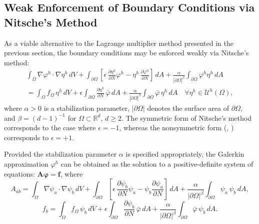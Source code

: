 	\subsection*{Weak Enforcement of Boundary Conditions via Nitsche's Method}
	
	As a viable alternative to the Lagrange multiplier method presented in the previous section, the boundary conditions may be enforced weakly via Nitsche's method:
	\begin{eqnarray}
		\int_{\Omega} \nabla \varphi^h \cdot \nabla \eta^h \, dV + \int_{\partial \Omega} \left[ \epsilon \, \frac{\partial \eta^h}{\partial N} \varphi^h - \eta^h \, \frac{\partial \varphi^h}{\partial N} \right] \, dA + \frac{\alpha}{|\partial \Omega|^{\beta}} \int_{\partial \Omega} \varphi^h \eta^h \, dA \nonumber \\ = \int_\Omega f_\Omega \, \eta^h \, dV + \epsilon \int_{\partial \Omega} \frac{\partial \eta^h}{\partial N} \, \bar{\varphi} \, dA + \frac{\alpha}{|\partial \Omega|^{\beta}} \int_{\partial \Omega} \bar{\varphi} \, \eta^h \, dA \quad \forall \eta^h \in \mathcal{U}^h (\Omega),
		\label{eq:vetfem}
	\end{eqnarray}
	where $\alpha > 0$ is a stabilization parameter, $| \partial \Omega |$ denotes the surface area of $\partial \Omega$, and $\beta = (d-1)^{-1}$ for $\Omega \subset \mathbb{R}^d$, $d \geq 2$. The symmetric form of Nitsche's method \cite{Juntunen&Stenberg:09} corresponds to the case where $\epsilon = -1$, whereas the nonsymmetric form (\cite{Freund:95}, \cite{Burman:12}) corresponds to $\epsilon = +1$.
	
	Provided the stabilization parameter $\alpha$ is specified appropriately, the Galerkin approximation $\varphi^h$ can be obtained as the solution to a positive-definite system of equations: $\mathbf{A} \boldsymbol{\varphi} = \mathbf{f}$, where
	\begin{equation}
		A_{ab} = \int_{\Omega} \nabla \psi_a \cdot \nabla \psi_b \, dV + \int_{\partial \Omega} \left[ \epsilon \, \frac{\partial \psi_b}{\partial N} \psi_a - \psi_b \frac{\partial \psi_a}{\partial N} \right] \, dA + \frac{\alpha}{|\partial \Omega|^{\beta}} \int_{\partial \Omega} \psi_a \, \psi_b \, dA,
	\end{equation}
	\begin{equation}
		f_{b} = \int_{\Omega} f_\Omega \, \psi_b \, dV + \epsilon \int_{\partial \Omega} \frac{\partial \psi_b}{\partial N} \, \bar{\varphi} \, dA + \frac{\alpha}{|\partial \Omega|^{\beta}} \int_{\partial \Omega} \bar{\varphi} \, \psi_b \, dA.
	\end{equation}
	
